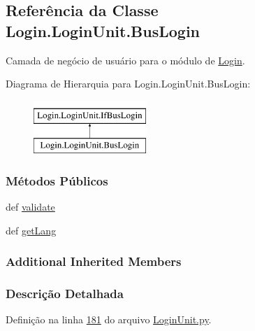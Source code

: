 \hypertarget{classLogin_1_1LoginUnit_1_1BusLogin}{\subsection{Referência da Classe Login.\-Login\-Unit.\-Bus\-Login}
\label{classLogin_1_1LoginUnit_1_1BusLogin}
}


Camada de negócio de usuário para o módulo de \hyperlink{namespaceLogin}{Login}.  


Diagrama de Hierarquia para Login.\-Login\-Unit.\-Bus\-Login\-:\begin{figure}[H]
\begin{center}
\leavevmode
\includegraphics[height=2.000000cm]{d9/d51/classLogin_1_1LoginUnit_1_1BusLogin}
\end{center}
\end{figure}
\subsubsection*{Métodos Públicos}
\begin{DoxyCompactItemize}
\item 
def \hyperlink{classLogin_1_1LoginUnit_1_1BusLogin_a2301425767b811697ce559801b955a58}{validate}
\item 
def \hyperlink{classLogin_1_1LoginUnit_1_1BusLogin_a23223ddd567bf874e6230efaf4912e98}{get\-Lang}
\end{DoxyCompactItemize}
\subsubsection*{Additional Inherited Members}


\subsubsection{Descrição Detalhada}


Definição na linha \hyperlink{LoginUnit_8py_source_l00181}{181} do arquivo \hyperlink{LoginUnit_8py_source}{Login\-Unit.\-py}.



